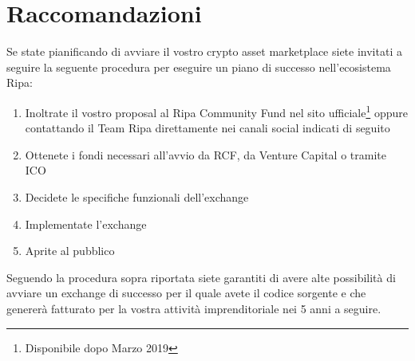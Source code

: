\documentclass[11pt,fleqn]{book} %
\begin{document}
\begin{tcbraster}[raster columns=2,raster rows=4,raster height=10cm,
	valign=center, halign=left,
	enhanced,size=small,sharp corners,colframe=silver,coltext=black,
	colback=silver,fit algorithm=hybrid* ]
\end{tcbraster}

\section{Raccomandazioni}
Se state pianificando di avviare il vostro crypto asset marketplace siete invitati a seguire la seguente
procedura per eseguire un piano di successo nell'ecosistema Ripa:
\begin{enumerate}
	\item Inoltrate il vostro proposal al Ripa Community Fund nel sito ufficiale\footnote{Disponibile dopo Marzo 2019}
	oppure contattando il Team Ripa direttamente nei canali social indicati di seguito
	\item Ottenete i fondi necessari all'avvio da RCF, da Venture Capital o tramite ICO 
	\item Decidete le specifiche funzionali dell'exchange
	\item Implementate l'exchange
	\item Aprite al pubblico
\end{enumerate}

Seguendo la procedura sopra riportata siete garantiti di avere alte possibilità di avviare un exchange di 
successo per il quale avete il codice sorgente e che genererà fatturato per la vostra attività 
imprenditoriale nei 5 anni a seguire.
\end{document}

